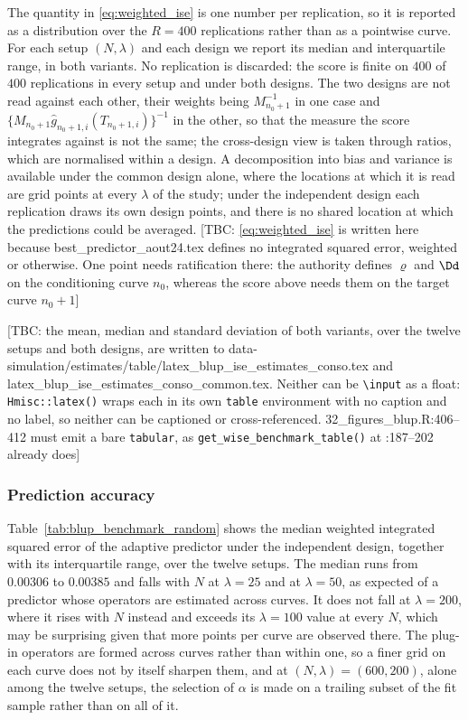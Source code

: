 The quantity in \eqref{eq:weighted_ise} is one number per replication, so it is reported as a distribution over the $R = 400$ replications rather than as a pointwise curve. For each setup $(N,\lambda)$ and each design we report its median and interquartile range, in both variants. No replication is discarded: the score is finite on $400$ of $400$ replications in every setup and under both designs. The two designs are not read against each other, their weights being $M_{n_0+1}^{-1}$ in one case and $\{M_{n_0+1}\widehat g_{n_0+1,i}(T_{n_0+1,i})\}^{-1}$ in the other, so that the measure the score integrates against is not the same; the cross-design view is taken through ratios, which are normalised within a design. A decomposition into bias and variance is available under the common design alone, where the locations at which it is read are grid points at every $\lambda$ of the study; under the independent design each replication draws its own design points, and there is no shared location at which the predictions could be averaged.
[TBC: \eqref{eq:weighted_ise} is written here because best\_predictor\_aout24.tex defines no integrated squared error, weighted or otherwise. One point needs ratification there: the authority defines $\varrho$ and $\Dd$ on the conditioning curve $n_0$, whereas the score above needs them on the target curve $n_0+1$]

[TBC: the mean, median and standard deviation of both variants, over the twelve setups and both designs, are written to data-simulation/estimates/table/latex\_blup\_ise\_estimates\_conso.tex and latex\_blup\_ise\_estimates\_conso\_common.tex. Neither can be \texttt{\textbackslash input} as a float: \texttt{Hmisc::latex()} wraps each in its own \texttt{table} environment with no caption and no label, so neither can be captioned or cross-referenced. 32\_figures\_blup.R:406--412 must emit a bare \texttt{tabular}, as \texttt{get\_wise\_benchmark\_table()} at :187--202 already does]
\color{black}

\subsubsection{\color{magenta}Prediction accuracy\color{black}}

\color{magenta}
Table~\ref{tab:blup_benchmark_random} shows the median weighted integrated squared error of the adaptive predictor under the independent design, together with its interquartile range, over the twelve setups. The median runs from $0.00306$ to $0.00385$ and falls with $N$ at $\lambda = 25$ and at $\lambda = 50$, as expected of a predictor whose operators are estimated across curves. It does not fall at $\lambda = 200$, where it rises with $N$ instead and exceeds its $\lambda = 100$ value at every $N$, which may be surprising given that more points per curve are observed there. The plug-in operators are formed across curves rather than within one, so a finer grid on each curve does not by itself sharpen them, and at $(N, \lambda) = (600, 200)$, alone among the twelve setups, the selection of $\alpha$ is made on a trailing subset of the fit sample rather than on all of it.

